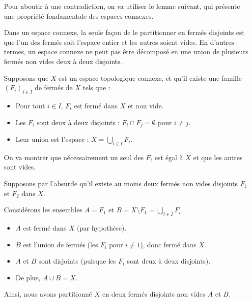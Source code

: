 Pour aboutir {\`a} une contradiction, on va utiliser le lemme suivant, qui
pr{\'e}sente une propri{\'e}t{\'e} fondamentale des espaces connexes.


Dans un espace connexe, la seule fa{\c c}on de le partitionner en ferm{\'e}s
disjoints est que l'un des ferm{\'e}s soit l'espace entier et les autres
soient vides. En d'autres termes, un espace connexe ne peut pas {\^e}tre
d{\'e}compos{\'e} en une union de plusieurs ferm{\'e}s non vides deux {\`a}
deux disjoints.


Supposons que $X$ est un espace topologique connexe, et qu'il existe une
famille $(F_i)_{i \in I}$ de ferm{\'e}s de $X$ tels que :
\begin{itemize}
  \item Pour tout $i \in I$, $F_i$ est ferm{\'e} dans $X$ et non vide.
  
  \item Les $F_i$ sont deux {\`a} deux disjoints : $F_i \cap F_j = \emptyset$
  pour $i \neq j$.
  
  \item Leur union est l'espace : $X = \underset{i \in I}{\bigcup} F_i$.
\end{itemize}


On va montrer que n{\'e}cessairement un seul des $F_i$ est {\'e}gal {\`a} $X$
et que les autres sont vides.

Supposons par l'absurde qu'il existe au moins deux ferm{\'e}s non vides
disjoints $F_1$ et $F_2$ dans $X$.

Consid{\'e}rons les ensembles $A = F_1$ et $B = X \setminus F_1 = \underset{i
\in I}{\bigcup} F_i$.
\begin{itemize}
  \item $A$ est ferm{\'e} dans $X$ (par hypoth{\`e}se).
  
  \item $B$ est l'union de ferm{\'e}s (les $F_i$ pour $i \neq 1$), donc
  ferm{\'e} dans $X$.
  
  \item $A$ et $B$ sont disjoints (puisque les $F_i$ sont deux {\`a} deux
  disjoints).
  
  \item De plus, $A \cup B = X$.
\end{itemize}


Ainsi, nous avons partitionn{\'e} $X$ en deux ferm{\'e}s disjoints non vides
$A$ et $B$.


